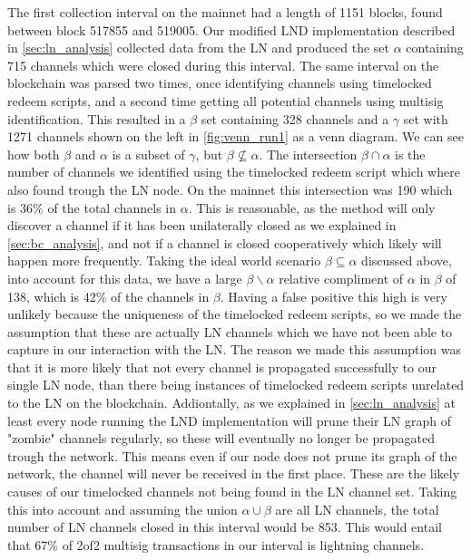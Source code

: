 The first collection interval on the mainnet had a length of 1151 blocks, found between block 517855 and 519005. Our modified LND implementation described in \cref{sec:ln_analysis} collected data from the LN and produced the set $\alpha$ containing 715 channels which were closed during this interval. The same interval on the blockchain was parsed two times, once identifying channels using timelocked redeem scripts, and a second time getting all potential channels using multisig identification. This resulted in a $\beta$ set containing 328 channels and a $\gamma$ set with 1271 channels shown on the left in \cref{fig:venn_run1} as a venn diagram. We can see how both $\beta$ and $\alpha$ is a subset of $\gamma$, but $\beta \not\subseteq \alpha$. The intersection $\beta \cap \alpha$ is the number of channels we identified using the timelocked redeem script which where also found trough the LN node. On the mainnet this intersection was 190 which is 36\% of the total channels in $\alpha$. This is reasonable, as the method will only discover a channel if it has been unilaterally closed as we explained in \cref{sec:bc_analysis}, and not if a channel is closed cooperatively which likely will happen more frequently. Taking the ideal world scenario $\beta \subseteq \alpha$ discussed above, into account for this data, we have a large $\beta \backslash{} \alpha$ relative compliment of $\alpha$ in $\beta$ of 138, which is 42\% of the channels in $\beta$. Having a false positive this high is very unlikely because the uniqueness of the timelocked redeem scripts, so we made the assumption that these are actually LN channels which we have not been able to capture in our interaction with the LN. The reason we made this assumption was that it is more likely that not every channel is propagated successfully to our single LN node, than there being instances of timelocked redeem scripts unrelated to the LN on the blockchain. Addiontally, as we explained in \cref{sec:ln_analysis} at least every node running the LND implementation will prune their LN graph of "zombie" channels regularly, so these will eventually no longer be propagated trough the network. This means even if our node does not prune its graph of the network, the channel will never be received in the first place. These are the likely causes of our timelocked channels not being found in the LN channel set.
Taking this into account and assuming the union $\alpha \cup \beta$ are all LN channels, the total number of LN channels closed in this interval would be 853. This would entail that 67\% of 2of2 multisig transactions in our interval is lightning channels. 
\\

